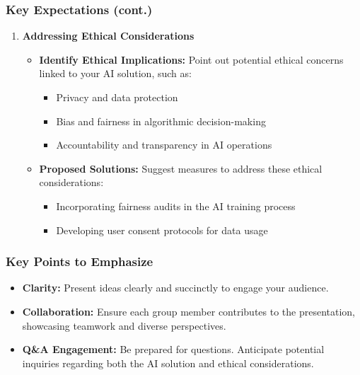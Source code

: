 \documentclass[aspectratio=169]{beamer}
\begin{document}
\begin{frame}[fragile]
    \frametitle{Key Expectations (cont.)}

    \begin{enumerate}[resume]
        \item \textbf{Addressing Ethical Considerations}
            \begin{itemize}
                \item \textbf{Identify Ethical Implications:} Point out potential ethical concerns linked to your AI solution, such as:
                    \begin{itemize}
                        \item Privacy and data protection
                        \item Bias and fairness in algorithmic decision-making
                        \item Accountability and transparency in AI operations
                    \end{itemize}
                \item \textbf{Proposed Solutions:} Suggest measures to address these ethical considerations:
                    \begin{itemize}
                        \item Incorporating fairness audits in the AI training process
                        \item Developing user consent protocols for data usage
                    \end{itemize}
            \end{itemize}
    \end{enumerate}
\end{frame}

\begin{frame}[fragile]
    \frametitle{Key Points to Emphasize}

    \begin{itemize}
        \item \textbf{Clarity:} Present ideas clearly and succinctly to engage your audience.
        \item \textbf{Collaboration:} Ensure each group member contributes to the presentation, showcasing teamwork and diverse perspectives.
        \item \textbf{Q\&A Engagement:} Be prepared for questions. Anticipate potential inquiries regarding both the AI solution and ethical considerations.
    \end{itemize}
\end{frame}
\end{document}
